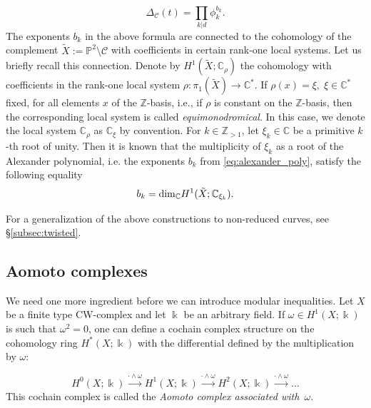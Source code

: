\documentclass[11pt]{amsart}
\def\cC{\mathcal{C}}
\def\CC{\mathbb{C}}
\def\kk{\Bbbk}
\theoremstyle{plain}
\theoremstyle{definition}
\begin{document}
\begin{equation}
\label{eq:alexander_poly}
\Delta_{\mathcal{C}}(t) = \prod_{k | d} \phi_{k}^{b_k}.
\end{equation}
The exponents $b_k$ in the above formula are connected to the cohomology of the complement $ \tilde X:= \mathbb{P}^2 \setminus \cC$ with coefficients in certain rank-one local systems. Let us briefly recall this connection.
Denote by $H^1(\tilde X; \mathbb{C}_{\rho})$ the cohomology with coefficients in the rank-one local system $\rho: \pi_1(\tilde X) \rightarrow \mathbb{C}^*$.
If $\rho(x) = \xi, \; \xi \in \CC^*$ fixed, for all elements $x$ of the $\mathbb{Z}$-basis, i.e.,  if $\rho$ is constant on the $\mathbb{Z}$-basis,  then the corresponding local system is called {\it equimonodromical}. In this case, we denote the local system $\mathbb{C}_{\rho}$ as $\mathbb{C}_{\xi}$ by convention.
For $k \in \mathbb{Z}_{>1}$, let $\xi_k \in \mathbb{C}$ be a primitive $k$-th root of unity.
Then it is known that
the multiplicity of $\xi_k$ as a root of the Alexander polynomial, i.e. the exponents $b_k$ from \eqref{eq:alexander_poly}, satisfy the following equality
\begin{equation}
\label{eq:local_betti}
b_k = {\rm dim}_{\mathbb{C}}H^1(\tilde X;\mathbb{C}_{\xi_k}).
\end{equation}

For a generalization of the above constructions to non-reduced curves, see \S\ref{subsec:twisted}.

\subsection {Aomoto complexes}
We need one more ingredient before we can introduce modular inequalities.
Let $X$ be a finite type CW-complex and let $\kk$ be an arbitrary field. If $\omega \in H^1(X;\kk)$ is such that $\omega^2=0$, one can define a cochain complex structure on the cohomology ring $H^*(X;\kk)$ with the differential defined by the multiplication by $\omega$:

\begin{equation}
\label{eq:Aomoto_complex}
H^0(X;\kk) \overset{ \cdot \wedge \omega} \longrightarrow H^1 (X;\kk) \overset{ \cdot\wedge \omega} \longrightarrow H^2(X;\kk) \overset{\cdot \wedge \omega} \longrightarrow \dots
\end{equation}
This cochain complex is called the {\it Aomoto complex associated with~$\omega$}. 
\end{document}
